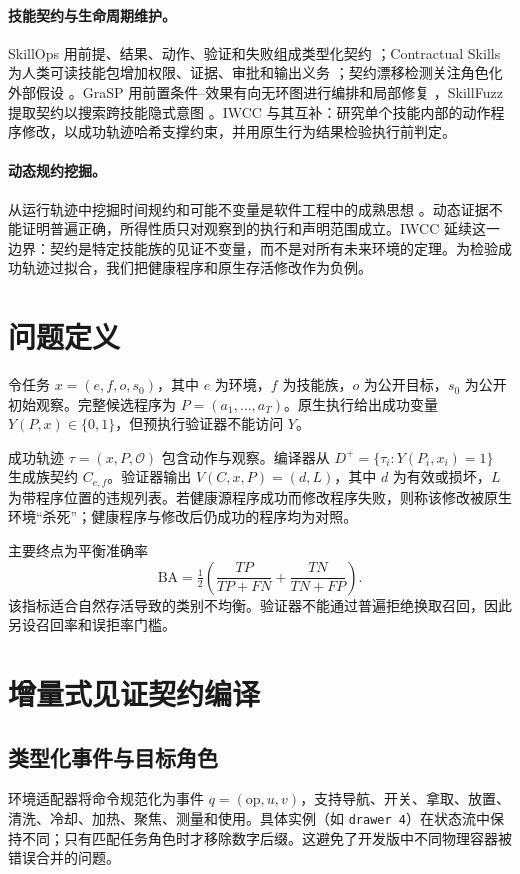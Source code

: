 \documentclass[10pt]{article}
\begin{document}
\paragraph{技能契约与生命周期维护。}
SkillOps 用前提、结果、动作、验证和失败组成类型化契约 \citep{pu2026skillops}；Contractual Skills 为人类可读技能包增加权限、证据、审批和输出义务 \citep{liu2026contractual}；契约漂移检测关注角色化外部假设 \citep{fan2026drift}。GraSP 用前置条件--效果有向无环图进行编排和局部修复 \citep{xia2026grasp}，SkillFuzz 提取契约以搜索跨技能隐式意图 \citep{hu2026skillfuzz}。IWCC 与其互补：研究单个技能内部的动作程序修改，以成功轨迹哈希支撑约束，并用原生行为结果检验执行前判定。

\paragraph{动态规约挖掘。}
从运行轨迹中挖掘时间规约和可能不变量是软件工程中的成熟思想 \citep{ammons2002mining,ernst2007daikon,beschastnikh2011synoptic}。动态证据不能证明普遍正确，所得性质只对观察到的执行和声明范围成立。IWCC 延续这一边界：契约是特定技能族的见证不变量，而不是对所有未来环境的定理。为检验成功轨迹过拟合，我们把健康程序和原生存活修改作为负例。

\section{问题定义}
令任务 $x=(e,f,o,s_0)$，其中 $e$ 为环境，$f$ 为技能族，$o$ 为公开目标，$s_0$ 为公开初始观察。完整候选程序为 $P=(a_1,\ldots,a_T)$。原生执行给出成功变量 $Y(P,x)\in\{0,1\}$，但预执行验证器不能访问 $Y$。

成功轨迹 $\tau=(x,P,\mathcal{O})$ 包含动作与观察。编译器从 $D^+=\{\tau_i:Y(P_i,x_i)=1\}$ 生成族契约 $C_{e,f}$。验证器输出 $V(C,x,P)=(d,L)$，其中 $d$ 为有效或损坏，$L$ 为带程序位置的违规列表。若健康源程序成功而修改程序失败，则称该修改被原生环境“杀死”；健康程序与修改后仍成功的程序均为对照。

主要终点为平衡准确率
\[
\mathrm{BA}=\tfrac12\left(\frac{TP}{TP+FN}+\frac{TN}{TN+FP}\right).
\]
该指标适合自然存活导致的类别不均衡。验证器不能通过普遍拒绝换取召回，因此另设召回率和误拒率门槛。

\section{增量式见证契约编译}
\subsection{类型化事件与目标角色}
环境适配器将命令规范化为事件 $q=(\mathrm{op},u,v)$，支持导航、开关、拿取、放置、清洗、冷却、加热、聚焦、测量和使用。具体实例（如 \texttt{drawer 4}）在状态流中保持不同；只有匹配任务角色时才移除数字后缀。这避免了开发版中不同物理容器被错误合并的问题。
\end{document}
